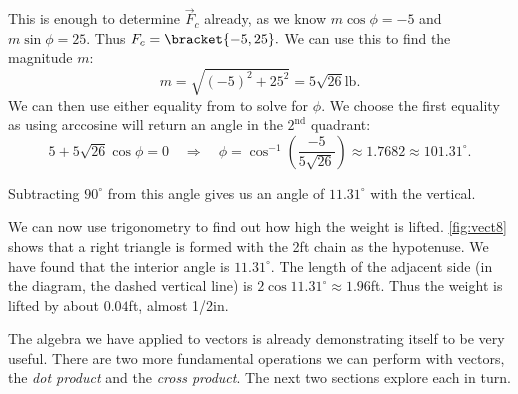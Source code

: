 \begin{example}
This is enough to determine $\vec F_c$ already, as we know $m\cos \phi = -5$ and $m\sin\phi =25$. Thus $F_c =\bracket{-5,25}.$ We can use this to find the magnitude $m$:
\[m = \sqrt{(-5)^2+25^2} = 5\sqrt{26}%
\text{lb}.\]
We can then use either equality from  to solve for $\phi$. We choose the first equality as using arccosine will return an angle in the $2^\text{nd}$ quadrant:
\[5 + 5\sqrt{26}\cos \phi = 0 \quad \Rightarrow \quad \phi = \cos^{-1}\left(\frac{-5}{5\sqrt{26}}\right) \approx 1.7682\approx 101.31^\circ.\]

Subtracting $90^\circ$ from this angle gives us an angle of $11.31^\circ$ with the vertical.

We can now use trigonometry to find out how high the weight is lifted. \autoref{fig:vect8} shows that a right triangle is formed with the 2ft chain as the hypotenuse.  We have found that the interior angle is $11.31^\circ$. The length of the adjacent side (in the diagram, the dashed vertical line) is $2\cos 11.31^\circ \approx 1.96$ft. Thus the weight is lifted by about $0.04$ft, almost 1/2in.
\end{example}

The algebra we have applied to vectors is already demonstrating itself to be very useful. There are two more fundamental operations we can perform with vectors, the \emph{dot product} and the \emph{cross product}. The next two sections explore each in turn.


